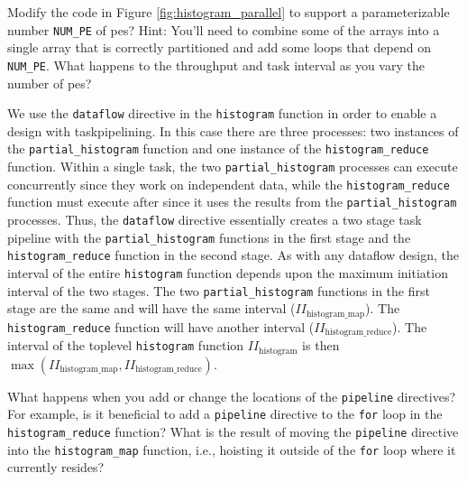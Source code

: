 \begin{exercise}
Modify the code in Figure \ref{fig:histogram_parallel} to support a parameterizable number \lstinline|NUM_PE| of \glspl{pe}? Hint: You'll need to combine some of the arrays into a single array that is correctly partitioned and add some loops that depend on \lstinline|NUM_PE|.  What happens to the throughput and task interval as you vary the number of \glspl{pe}? 
\end{exercise}

We use the \lstinline{dataflow} directive in the \lstinline{histogram} function in order to enable a design with \gls{taskpipelining}.   In this case there are three processes: two instances of the \lstinline{partial_histogram} function and one instance of the \lstinline{histogram_reduce} function. Within a single task, the two \lstinline{partial_histogram} processes can execute concurrently since they work on independent data, while the \lstinline{histogram_reduce} function must execute after since it uses the results from the  \lstinline{partial_histogram} processes. Thus, the \lstinline{dataflow} directive essentially creates a two stage task pipeline with the \lstinline{partial_histogram} functions in the first stage and the \lstinline{histogram_reduce} function in the second stage.   As with any dataflow design, the interval of the entire \lstinline{histogram} function depends upon the maximum initiation interval of the two stages. The two \lstinline{partial_histogram} functions in the first stage are the same and will have the same interval ($II_\mathrm{histogram\_map}$). The \lstinline{histogram_reduce} function will have another interval ($II_\mathrm{histogram\_reduce}$). The interval of the toplevel \lstinline{histogram} function $II_\mathrm{histogram}$ is then $\max (II_\mathrm{histogram\_map}, II_\mathrm{histogram\_reduce})$.

\begin{exercise}
What happens when you add or change the locations of the \lstinline{pipeline} directives? For example, is it beneficial to add a \lstinline{pipeline} directive to the \lstinline{for} loop in the \lstinline{histogram_reduce} function? What is the result of moving the \lstinline{pipeline} directive into the \lstinline{histogram_map} function, i.e., hoisting it outside of the \lstinline{for} loop where it currently resides? 
\end{exercise}

